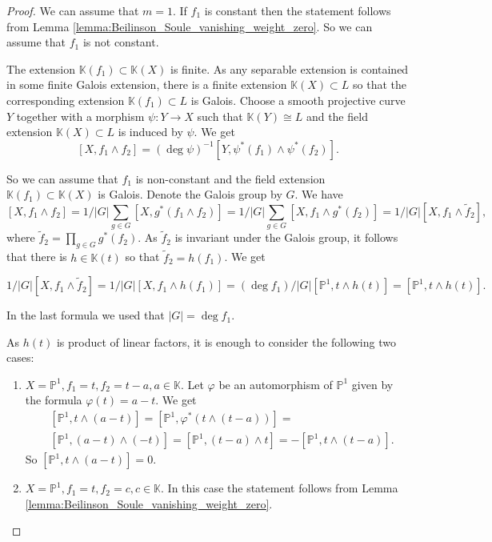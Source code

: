 \documentclass[12pt]{extarticle}
\def\mb{\mathbb}
\def\k{\mb K}
\def\ph{\varphi}
\def\wt{\widetilde}
\renewcommand{\P}{{\mb P}}
\begin{document}
\begin{proof} We can assume that $m=1$. If $f_1$ is constant then the statement follows from Lemma \ref{lemma:Beilinson_Soule_vanishing_weight_zero}. So we can assume that $f_1$ is not constant.


The extension $\k(f_1)\subset\k(X)$ is finite. As any separable extension is contained in some finite Galois extension, there is a finite extension $\k(X)\subset L$ so that the corresponding extension $\k(f_1)\subset L$ is Galois. Choose a smooth projective curve $Y$ together with a morphism $\psi\colon Y\to X$ such that $\k(Y)\cong L$ and the field extension $\k(X)\subset L$ is induced by $\psi$. We get
$$[X,f_1\wedge f_2]=(\deg\psi)^{-1}[Y,\psi^*(f_1)\wedge \psi^*(f_2)].$$

So we can assume that $f_1$ is non-constant and the field extension $\k(f_1)\subset \k(X)$ is Galois. Denote the Galois group by $G$. We have
$$[X,f_1\wedge f_2]=1/|G|\sum\limits_{g\in G}[X,g^*(f_1\wedge f_2)]=1/|G|\sum\limits_{g\in G}[X,f_1\wedge g^*(f_2)]=1/|G|[X,f_1\wedge \wt f_2],$$
where $\wt f_2=\prod\limits_{g\in G}g^*(f_2)$. As $\wt f_2$ is invariant under the Galois group, it follows that there is $h\in\k(t)$ so that $\wt f_2=h(f_1)$. We get

$$1/|G|[X,f_1\wedge \wt f_2]=1/|G|[X,f_1\wedge h(f_1)]=(\deg f_1)/|G|[\P^1,t\wedge h(t)]=[\P^1,t\wedge h(t)].$$

In the last formula we used that $|G|=\deg f_1$.

As $h(t)$ is product of linear factors, it is enough to consider the following two cases:

        \begin{enumerate}

            \item $X=\P^1, f_1=t, f_2=t-a, a\in\k$. Let $\ph$ be an automorphism of $\mb P^1$ given by the formula $\ph(t)=a-t$. We get
            \begin{align*}
                &[\P^1, t\wedge (a-t)]=[\P^1, \ph^*(t\wedge (t-a))]=\\&[\P^1, (a-t)\wedge (-t)]=[\P^1, (t-a)\wedge t]=-[\P^1, t\wedge (t-a)].
            \end{align*}
            So $[\P^1, t\wedge (a-t)]=0$.
            \item $X=\P^1, f_1=t, f_2=c, c\in\k$. In this case the statement follows from Lemma \ref{lemma:Beilinson_Soule_vanishing_weight_zero}.
  \end{enumerate} 

\end{proof}
\end{document}
